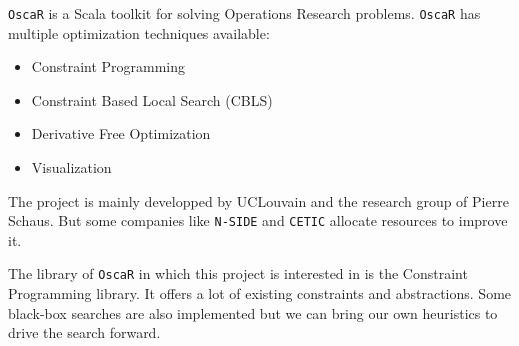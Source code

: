 \documentclass[../../thesis.tex]{subfiles}
\begin{document}
\texttt{OscaR} \cite{oscar} is a Scala toolkit for solving Operations Research problems. 
\texttt{OscaR} has multiple optimization techniques available:

\begin{itemize}
  \item Constraint Programming
  \item Constraint Based Local Search (CBLS)
  \item Derivative Free Optimization
  \item Visualization
\end{itemize}

The project is mainly developped by UCLouvain and the research group of Pierre Schaus. But some companies like \texttt{N-SIDE} and \texttt{CETIC} allocate resources to improve it.

The library of \texttt{OscaR} in which this project is interested in is the Constraint Programming library. It offers a lot of existing constraints and abstractions. Some black-box searches are also 
implemented but we can bring our own heuristics to drive the search forward.
\end{document}
